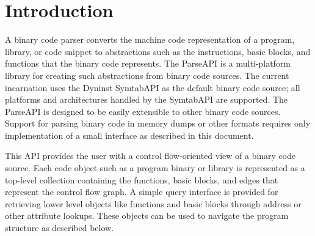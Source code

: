 \section{Introduction}
\label{sec:intro}

A binary code parser converts the machine code representation of a program,
library, or code snippet to abstractions such as the instructions, basic
blocks, and functions that the binary code represents. The ParseAPI is a
multi-platform library for creating such abstractions from binary code sources.
The current incarnation uses the Dyninst SymtabAPI as the default binary code
source; all platforms and architectures handled by the SymtabAPI are supported.
The ParseAPI is designed to be easily extensible to other binary code sources.
Support for parsing binary code in memory dumps or other formats requires only
implementation of a small interface as described in this document.

This API provides the user with a control flow-oriented view of a binary code
source. Each code object such as a program binary or library is represented as
a top-level collection containing the functions, basic blocks, and edges that
represent the control flow graph. A simple query interface is provided for
retrieving lower level objects like functions and basic blocks through address
or other attribute lookups. These objects can be used to navigate the program
structure as described below.
